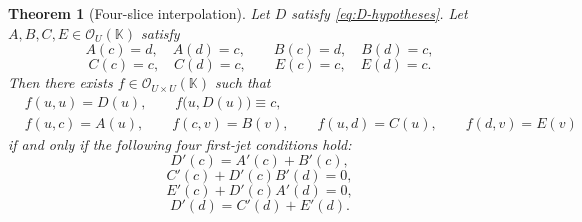 \documentclass[11pt]{amsart}
\numberwithin{equation}{section}
\newtheorem{theorem}{Theorem}[section]
\theoremstyle{remark}
\theoremstyle{definition}
\newcommand{\K}{\mathbb{K}}
\newcommand{\Oc}{\mathcal{O}}
\begin{document}
\begin{theorem}[Four-slice interpolation]\label{thm:four-slice}
Let $D$ satisfy \eqref{eq:D-hypotheses}. Let $A,B,C,E\in \Oc_U(\K)$ satisfy
\[
A(c)=d,\quad A(d)=c,\qquad B(c)=d,\quad B(d)=c,
\]
\[
C(c)=c,\quad C(d)=c,\qquad E(c)=c,\quad E(d)=c.
\]
Then there exists $f\in \Oc_{U\times U}(\K)$ such that
\begin{align}
&f(u,u)=D(u),\qquad f\bigl(u,D(u)\bigr)\equiv c, \label{eq:four-slice-main-1}\\
&f(u,c)=A(u),\qquad f(c,v)=B(v),\qquad f(u,d)=C(u),\qquad f(d,v)=E(v) \label{eq:four-slice-main-2}
\end{align}
if and only if the following four first-jet conditions hold:
\begin{equation}\label{eq:four-slice-jets-1}
D'(c)=A'(c)+B'(c),
\end{equation}
\begin{equation}\label{eq:four-slice-jets-2}
C'(c)+D'(c)B'(d)=0,
\end{equation}
\begin{equation}\label{eq:four-slice-jets-3}
E'(c)+D'(c)A'(d)=0,
\end{equation}
\begin{equation}\label{eq:four-slice-jets-4}
D'(d)=C'(d)+E'(d).
\end{equation}
\end{theorem}
\end{document}

